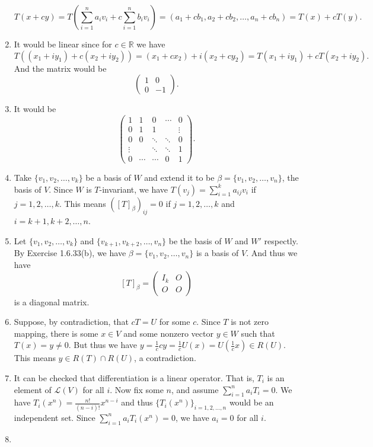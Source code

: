\begin{enumerate}
\[T(x+cy)=T(\sum_{i=1}^n{a_iv_i}+c\sum_{i=1}^n{b_iv_i})=(a_1+cb_1,a_2+cb_2,\ldots ,a_n+cb_n)=T(x)+cT(y).\]
\item It would be linear since for $c\in \mathbb{R}$ we have
\[T((x_1+iy_1)+c(x_2+iy_2))=(x_1+cx_2)+i(x_2+cy_2)=T(x_1+iy_1)+cT(x_2+iy_2).\]
And the matrix would be 
\[\left(\begin{array}{cc}1&0\\0&-1 \end{array}\right) .\]
\item It would be 
\[\left(\begin{array}{ccccc}1&1&0&\cdots &0\\ 0&1&1& &\vdots \\ 0&0&\ddots &\ddots &0\\ \vdots & &\ddots &\ddots &1\\ 0&\cdots &\cdots &0&1 \end{array}\right).\]
\item  Take $\{v_1,v_2,\ldots ,v_k\}$ be a basis of $W$ and extend it to be $\beta =\{v_1,v_2,\ldots ,v_n\}$, the basis of $V$. Since $W$ is $T$-invariant, we have $T(v_j)=\sum_{i=1}^k{a_{ij}v_i}$ if $j=1,2,\ldots ,k$. This means $([T]_{\beta })_{ij}=0$ if $j=1,2,\ldots ,k$ and $i=k+1,k+2,\ldots ,n$.
\item Let $\{v_1,v_2,\ldots ,v_k\}$ and $\{v_{k+1},v_{k+2},\ldots ,v_n\}$ be the basis of $W$ and $W'$ respectly. By Exercise 1.6.33(b), we have $\beta =\{v_1,v_2,\ldots ,v_n\}$ is a basis of $V$. And thus we have 
\[[T]_{\beta }=\left(\begin{array}{cc}I_k&O\\O&O \end{array}\right) \]
is a diagonal matrix.
\item Suppose, by contradiction, that $cT=U$ for some $c$. Since $T$ is not zero mapping, there is some $x\in V$ and some nonzero vector $y\in W$ such that $T(x)=y\neq 0$. But thus we have $y=\frac{1}{c}cy=\frac{1}{c}U(x)=U(\frac{1}{c}x)\in R(U)$. This means $y\in R(T)\cap R(U)$, a contradiction.
\item It can be checked that differentiation is a linear operator. That is, $T_i$ is an element of $\mathcal{L}(V)$ for all $i$. Now fix some $n$, and assume $\sum_{i=1}^n{a_iT_i}=0$. We have $T_i(x^n)=\frac{n!}{(n-i)!}x^{n-i}$ and thus $\{T_i(x^n)\}_{i=1,2,\ldots ,n}$ would be an independent set. Since $\sum_{i=1}^n{a_iT_i(x^n)}=0$, we have $a_i=0$ for all $i$.
\item \begin{enumerate}

\end{enumerate}
\end{enumerate}
